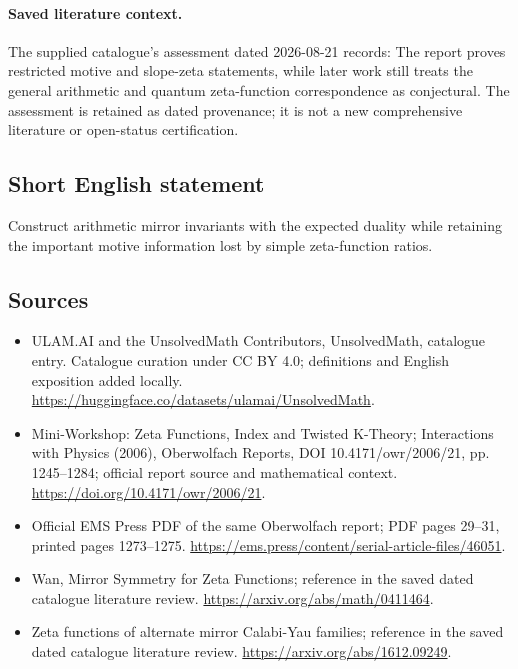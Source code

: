 \documentclass[11pt]{article}
\begin{document}
\paragraph{Saved literature context.} The supplied catalogue's assessment dated 2026-08-21 records: The report proves restricted motive and slope-zeta statements, while later work still treats the general arithmetic and quantum zeta-function correspondence as conjectural. The assessment is retained as dated provenance; it is not a new comprehensive literature or open-status certification.
\subsection{Short English statement}
Construct arithmetic mirror invariants with the expected duality while retaining the important motive information lost by simple zeta-function ratios.
\subsection{Sources}
\begin{itemize}
\item[\hypertarget{source:statement:1}{S1}] ULAM.AI and the UnsolvedMath Contributors, UnsolvedMath, catalogue entry. Catalogue curation under CC BY 4.0; definitions and English exposition added locally.
\url{https://huggingface.co/datasets/ulamai/UnsolvedMath}.
\item[\hypertarget{source:statement:2}{S2}] Mini-Workshop: Zeta Functions, Index and Twisted K-Theory; Interactions with Physics (2006), Oberwolfach Reports, DOI 10.4171/owr/2006/21, pp. 1245--1284; official report source and mathematical context.
\url{https://doi.org/10.4171/owr/2006/21}.
\item[\hypertarget{source:statement:3}{S3}] Official EMS Press PDF of the same Oberwolfach report; PDF pages 29--31, printed pages 1273--1275.
\url{https://ems.press/content/serial-article-files/46051}.
\item[\hypertarget{source:statement:4}{S4}] Wan, Mirror Symmetry for Zeta Functions; reference in the saved dated catalogue literature review.
\url{https://arxiv.org/abs/math/0411464}.
\item[\hypertarget{source:statement:5}{S5}] Zeta functions of alternate mirror Calabi-Yau families; reference in the saved dated catalogue literature review.
\url{https://arxiv.org/abs/1612.09249}.
\end{itemize}
\label{end:statement}
\end{document}
